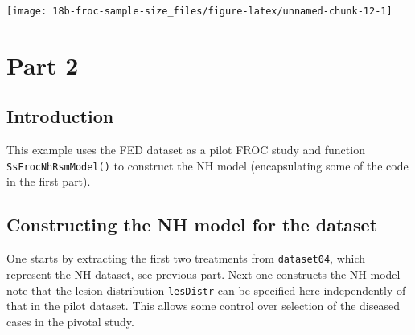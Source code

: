 \documentclass[
]{book}
\newenvironment{Shaded}{\begin{snugshade}}{\end{snugshade}}
\newcommand{\AttributeTok}[1]{\textcolor[rgb]{0.77,0.63,0.00}{#1}}
\newcommand{\DecValTok}[1]{\textcolor[rgb]{0.00,0.00,0.81}{#1}}
\newcommand{\FloatTok}[1]{\textcolor[rgb]{0.00,0.00,0.81}{#1}}
\newcommand{\FunctionTok}[1]{\textcolor[rgb]{0.00,0.00,0.00}{#1}}
\newcommand{\NormalTok}[1]{#1}
\newcommand{\OtherTok}[1]{\textcolor[rgb]{0.56,0.35,0.01}{#1}}
\newcommand{\SpecialCharTok}[1]{\textcolor[rgb]{0.00,0.00,0.00}{#1}}
\begin{document}
\begin{center}\texttt{[image: 18b-froc-sample-size\_files/figure-latex/unnamed-chunk-12-1]} \end{center}

\hypertarget{part-2}{%
\section{Part 2}\label{part-2}}

\hypertarget{introduction}{%
\subsection{Introduction}\label{introduction}}

This example uses the FED dataset as a pilot FROC study and function \texttt{SsFrocNhRsmModel()} to construct the NH model (encapsulating some of the code in the first part).

\hypertarget{constructing-the-nh-model-for-the-dataset}{%
\subsection{Constructing the NH model for the dataset}\label{constructing-the-nh-model-for-the-dataset}}

One starts by extracting the first two treatments from \texttt{dataset04}, which represent the NH dataset, see previous part. Next one constructs the NH model - note that the lesion distribution \texttt{lesDistr} can be specified here independently of that in the pilot dataset. This allows some control over selection of the diseased cases in the pivotal study.

\begin{Shaded}
\end{Shaded}
\end{document}
